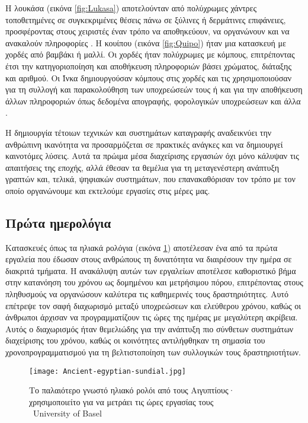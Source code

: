             Η λουκάσα (εικόνα \ref{fig:Lukasa}) αποτελούνταν από πολύχρωμες χάντρες τοποθετημένες σε συγκεκριμένες θέσεις πάνω σε ξύλινες ή δερμάτινες επιφάνειες, προσφέροντας στους χειριστές έναν τρόπο να αποθηκεύουν, να οργανώνουν και να ανακαλούν πληροφορίες \cite{Lukasa}. Η κουίπου (εικόνα \ref{fig:Quipo}) ήταν μια κατασκευή με χορδές από βαμβάκι ή μαλλί. Οι χορδές ήταν πολύχρωμες με κόμπους, επιτρέποντας έτσι την κατηγοριοποίηση και αποθήκευση πληροφοριών βάσει χρώματος, διάταξης και αριθμού. Οι Ίνκα δημιουργούσαν κόμπους στις χορδές και τις χρησιμοποιούσαν για τη συλλογή και παρακολούθηση των υποχρεώσεών τους ή και για την αποθήκευση άλλων πληροφοριών όπως δεδομένα απογραφής, φορολογικών υποχρεώσεων και άλλα \cite{Quipu}.

            Η δημιουργία τέτοιων τεχνικών και συστημάτων καταγραφής αναδεικνύει την ανθρώπινη ικανότητα να προσαρμόζεται σε πρακτικές ανάγκες και να δημιουργεί καινοτόμες λύσεις. Αυτά τα πρώιμα μέσα διαχείρισης εργασιών όχι μόνο κάλυψαν τις απαιτήσεις της εποχής, αλλά έθεσαν τα θεμέλια για τη μεταγενέστερη ανάπτυξη γραπτών και, τελικά, ψηφιακών συστημάτων, που επανακαθόρισαν τον τρόπο με τον οποίο οργανώνουμε και εκτελούμε εργασίες στις μέρες μας.

        \subsection{Πρώτα ημερολόγια}
            Κατασκευές όπως τα ηλιακά ρολόγια (εικόνα \ref{fig:Ancient-egyptian-sundial}) αποτέλεσαν ένα από τα πρώτα εργαλεία που έδωσαν στους ανθρώπους τη δυνατότητα να διαιρέσουν την ημέρα σε διακριτά τμήματα. Η ανακάλυψη αυτών των εργαλείων αποτέλεσε καθοριστικό βήμα στην κατανόηση του χρόνου ως δομημένου και μετρήσιμου πόρου, επιτρέποντας στους πληθυσμούς να οργανώσουν καλύτερα τις καθημερινές τους δραστηριότητες. Αυτό επέτρεψε τον σαφή διαχωρισμό μεταξύ υποχρεώσεων και ελεύθερου χρόνου, καθώς οι άνθρωποι άρχισαν να προγραμματίζουν τις ώρες της ημέρας με μεγαλύτερη ακρίβεια. Αυτός ο διαχωρισμός ήταν θεμελιώδης για την ανάπτυξη πιο σύνθετων συστημάτων διαχείρισης του χρόνου, καθώς οι κοινότητες αντιλήφθηκαν τη σημασία του χρονοπρογραμματισμού για τη βελτιστοποίηση των συλλογικών τους δραστηριοτήτων.

            \begin{figure}[h!] \noindent \centering
                \texttt{[image: Ancient-egyptian-sundial.jpg]}
                \caption{\centering Το παλαιότερο γνωστό ηλιακό ρολόι από τους Αιγυπτίους· \\ χρησιμοποιείτο για να μετράει τις ώρες εργασίας τους \\ {\footnotesize \textcopyright\ University of Basel}}
                \label{fig:Ancient-egyptian-sundial}
            \end{figure}

